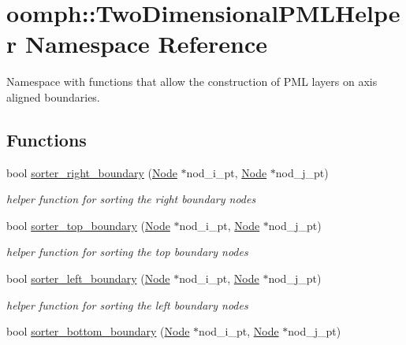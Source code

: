 \hypertarget{namespaceoomph_1_1TwoDimensionalPMLHelper}{}\section{oomph\+:\+:Two\+Dimensional\+P\+M\+L\+Helper Namespace Reference}
\label{namespaceoomph_1_1TwoDimensionalPMLHelper}


Namespace with functions that allow the construction of P\+ML layers on axis aligned boundaries.  


\subsection*{Functions}
\begin{DoxyCompactItemize}
\item 
bool \hyperlink{namespaceoomph_1_1TwoDimensionalPMLHelper_ae66c595a953e030ae366699eec3ca3ab}{sorter\+\_\+right\+\_\+boundary} (\hyperlink{classoomph_1_1Node}{Node} $\ast$nod\+\_\+i\+\_\+pt, \hyperlink{classoomph_1_1Node}{Node} $\ast$nod\+\_\+j\+\_\+pt)
\begin{DoxyCompactList}\small\item\em helper function for sorting the right boundary nodes \end{DoxyCompactList}\item 
bool \hyperlink{namespaceoomph_1_1TwoDimensionalPMLHelper_a98d2786e22298095bd190435d11c4f0e}{sorter\+\_\+top\+\_\+boundary} (\hyperlink{classoomph_1_1Node}{Node} $\ast$nod\+\_\+i\+\_\+pt, \hyperlink{classoomph_1_1Node}{Node} $\ast$nod\+\_\+j\+\_\+pt)
\begin{DoxyCompactList}\small\item\em helper function for sorting the top boundary nodes \end{DoxyCompactList}\item 
bool \hyperlink{namespaceoomph_1_1TwoDimensionalPMLHelper_aecb74c39efe7c572a9d87b2d11be3d69}{sorter\+\_\+left\+\_\+boundary} (\hyperlink{classoomph_1_1Node}{Node} $\ast$nod\+\_\+i\+\_\+pt, \hyperlink{classoomph_1_1Node}{Node} $\ast$nod\+\_\+j\+\_\+pt)
\begin{DoxyCompactList}\small\item\em helper function for sorting the left boundary nodes \end{DoxyCompactList}\item 
bool \hyperlink{namespaceoomph_1_1TwoDimensionalPMLHelper_a0bd68e9d424ff3f05266786cc6c78baa}{sorter\+\_\+bottom\+\_\+boundary} (\hyperlink{classoomph_1_1Node}{Node} $\ast$nod\+\_\+i\+\_\+pt, \hyperlink{classoomph_1_1Node}{Node} $\ast$nod\+\_\+j\+\_\+pt)

\end{DoxyCompactItemize}

